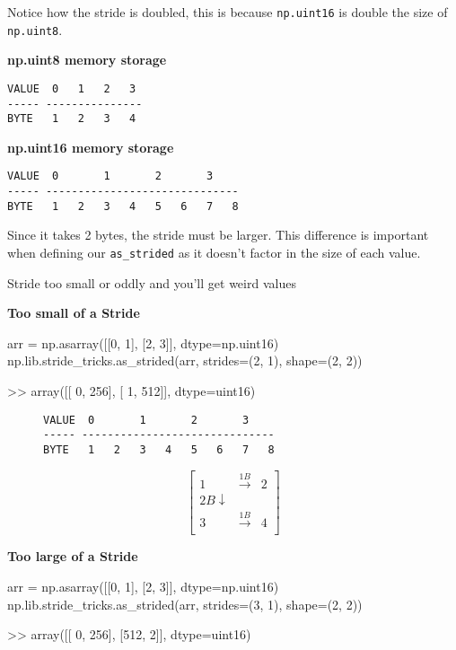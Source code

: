 \documentclass[oneside, 12pt]{report}
\begin{document}
Notice how the stride is doubled, this is because \verb+np.uint16+ is double the size of \verb+np.uint8+.

\textbf{np.uint8 memory storage}
\begin{verbatim}
VALUE  0   1   2   3
----- ---------------
BYTE   1   2   3   4
\end{verbatim}

\textbf{np.uint16 memory storage}
\begin{verbatim}
VALUE  0       1       2       3   
----- ------------------------------
BYTE   1   2   3   4   5   6   7   8
\end{verbatim}

Since it takes 2 bytes, the stride must be larger. This difference is important when defining our \verb+as_strided+ as it doesn't factor in the size of each value.

Stride too small or oddly and you'll get weird values

\textbf{Too small of a Stride}
\begin{python}
arr = np.asarray([[0, 1], [2, 3]], dtype=np.uint16)
np.lib.stride_tricks.as_strided(arr, strides=(2, 1), shape=(2, 2))

>> array([[  0, 256],
          [  1, 512]], dtype=uint16)
\end{python}

\begin{figure}[H]
\begin{verbatim}
VALUE  0       1       2       3   
----- ------------------------------
BYTE   1   2   3   4   5   6   7   8
\end{verbatim}
\end{figure}

\begin{figure}[H]
\begin{equation*}
\begin{bmatrix}
1 & \xrightarrow{1B} & 2 \\
2B \downarrow \\
3 & \xrightarrow{1B} & 4 \\
\end{bmatrix}
\end{equation*}
\end{figure}

\textbf{Too large of a Stride}
\begin{python}
arr = np.asarray([[0, 1], [2, 3]], dtype=np.uint16)
np.lib.stride_tricks.as_strided(arr, strides=(3, 1), shape=(2, 2))

>> array([[  0, 256],
          [512,   2]], dtype=uint16)
\end{python}
\end{document}
